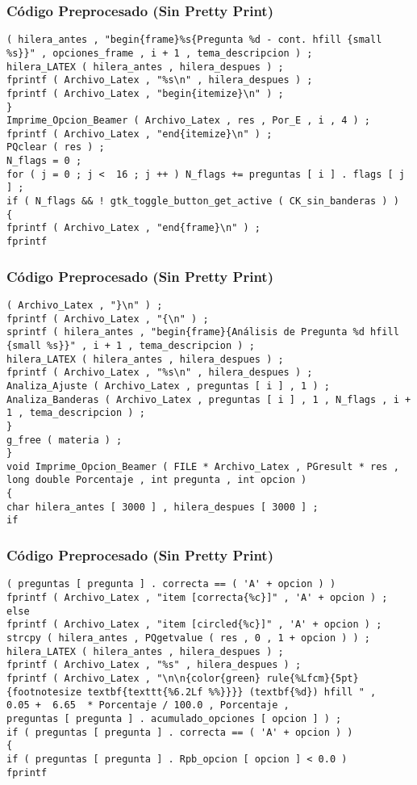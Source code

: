 \documentclass{beamer}
\begin{document}
\begin{frame}[fragile]
\frametitle{C\'odigo Preprocesado (Sin Pretty Print)}
\begin{lstlisting}[style=CStyle]
( hilera_antes , "begin{frame}%s{Pregunta %d - cont. hfill {small %s}}" , opciones_frame , i + 1 , tema_descripcion ) ; 
hilera_LATEX ( hilera_antes , hilera_despues ) ; 
fprintf ( Archivo_Latex , "%s\n" , hilera_despues ) ; 
fprintf ( Archivo_Latex , "begin{itemize}\n" ) ; 
} 
Imprime_Opcion_Beamer ( Archivo_Latex , res , Por_E , i , 4 ) ; 
fprintf ( Archivo_Latex , "end{itemize}\n" ) ; 
PQclear ( res ) ; 
N_flags = 0 ; 
for ( j = 0 ; j <  16 ; j ++ ) N_flags += preguntas [ i ] . flags [ j ] ; 
if ( N_flags && ! gtk_toggle_button_get_active ( CK_sin_banderas ) ) 
{ 
fprintf ( Archivo_Latex , "end{frame}\n" ) ; 
fprintf \end{lstlisting}
\end{frame}
\begin{frame}[fragile]
\frametitle{C\'odigo Preprocesado (Sin Pretty Print)}
\begin{lstlisting}[style=CStyle]
( Archivo_Latex , "}\n" ) ; 
fprintf ( Archivo_Latex , "{\n" ) ; 
sprintf ( hilera_antes , "begin{frame}{Análisis de Pregunta %d hfill {small %s}}" , i + 1 , tema_descripcion ) ; 
hilera_LATEX ( hilera_antes , hilera_despues ) ; 
fprintf ( Archivo_Latex , "%s\n" , hilera_despues ) ; 
Analiza_Ajuste ( Archivo_Latex , preguntas [ i ] , 1 ) ; 
Analiza_Banderas ( Archivo_Latex , preguntas [ i ] , 1 , N_flags , i + 1 , tema_descripcion ) ; 
} 
g_free ( materia ) ; 
} 
void Imprime_Opcion_Beamer ( FILE * Archivo_Latex , PGresult * res , long double Porcentaje , int pregunta , int opcion ) 
{ 
char hilera_antes [ 3000 ] , hilera_despues [ 3000 ] ; 
if \end{lstlisting}
\end{frame}
\begin{frame}[fragile]
\frametitle{C\'odigo Preprocesado (Sin Pretty Print)}
\begin{lstlisting}[style=CStyle]
( preguntas [ pregunta ] . correcta == ( 'A' + opcion ) ) 
fprintf ( Archivo_Latex , "item [correcta{%c}]" , 'A' + opcion ) ; 
else 
fprintf ( Archivo_Latex , "item [circled{%c}]" , 'A' + opcion ) ; 
strcpy ( hilera_antes , PQgetvalue ( res , 0 , 1 + opcion ) ) ; 
hilera_LATEX ( hilera_antes , hilera_despues ) ; 
fprintf ( Archivo_Latex , "%s" , hilera_despues ) ; 
fprintf ( Archivo_Latex , "\n\n{color{green} rule{%Lfcm}{5pt} {footnotesize textbf{texttt{%6.2Lf %%}}}} (textbf{%d}) hfill " , 
0.05 +  6.65  * Porcentaje / 100.0 , Porcentaje , 
preguntas [ pregunta ] . acumulado_opciones [ opcion ] ) ; 
if ( preguntas [ pregunta ] . correcta == ( 'A' + opcion ) ) 
{ 
if ( preguntas [ pregunta ] . Rpb_opcion [ opcion ] < 0.0 ) 
fprintf \end{lstlisting}
\end{frame}
\end{document}
